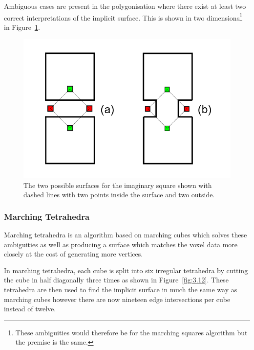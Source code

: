 Ambiguous cases are present in the polygonisation where there exist at least two correct interpretations of the implicit surface. This is shown in two dimensions\footnote{These ambiguities would therefore be for the marching squares algorithm but the premise is the same.} in Figure~\ref{fig:3.11}.

\begin{figure}
\centerline{\includegraphics[scale=0.5]{ambiguous.png}}
\caption{The two possible surfaces for the imaginary square shown with dashed lines with two points inside the surface and two outside.}
\label{fig:3.11}
\end{figure}

\clearpage
\subsubsection{Marching Tetrahedra}

Marching tetrahedra is an algorithm based on marching cubes which solves these ambiguities as well as producing a surface which matches the voxel data more closely at the cost of generating more vertices\cite{Tetrahedra}.

In marching tetrahedra, each cube is split into six irregular tetrahedra by cutting the cube in half diagonally three times as shown in Figure~\ref{fig:3.12}. These tetrahedra are then used to find the implicit surface in much the same way as marching cubes however there are now nineteen edge intersections per cube instead of twelve.

